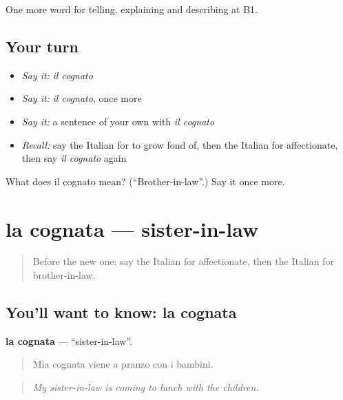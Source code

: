 \begin{grammarlens}[title={What you've built}]
One more word for telling, explaining and describing at B1.
\end{grammarlens}

\subsection*{Your turn}
\begin{itemize}
\raggedright
  \item \emph{Say it:} \emph{il cognato}
  \item \emph{Say it:} \emph{il cognato}, once more
  \item \emph{Say it:} a sentence of your own with \emph{il cognato}
  \item \emph{Recall:} say the Italian for to grow fond of, then the Italian for affectionate, then say \emph{il cognato} again
\end{itemize}

\begin{tcolorbox}[breakable,colback=teal!4,colframe=teal!35!black,title={Before you move on}]
What does il cognato mean? (\textquotedblleft{}Brother-in-law\textquotedblright{}.) Say it once more.
\end{tcolorbox}
\section[la cognata]{la cognata — sister-in-law}

\label{lesson:IT-C493-cognata}



\begin{quote}
Before the new one: say the Italian for affectionate, then the Italian for brother-in-law.
\end{quote}

\subsection*{You'll want to know: la cognata}
\textbf{la cognata} — \textquotedblleft{}sister-in-law\textquotedblright{}.

\begin{quote}
Mia cognata viene a pranzo con i bambini.
\end{quote}

\begin{quote}
\emph{My sister-in-law is coming to lunch with the children.}
\end{quote}

